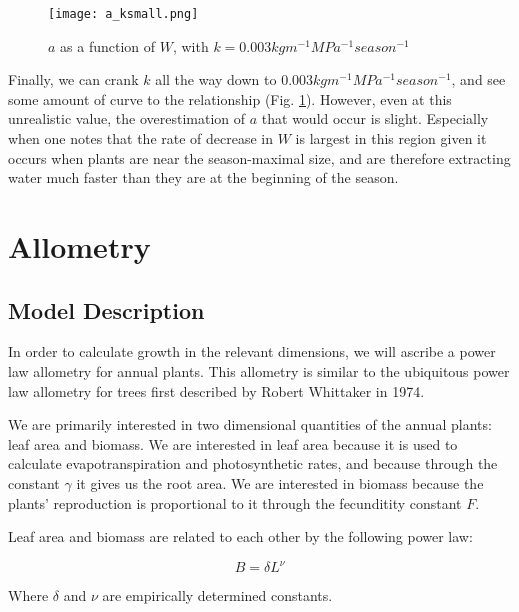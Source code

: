 \documentclass{article}
\begin{document}
  \begin{figure}[h]
    \caption{$a$ as a function of $W$, with $k = 0.003 kg m^{-1} MPa^{-1} season^{-1}$}
    \centering
    \texttt{[image: a\_ksmall.png]}
    \label{fig:a0.003}
  \end{figure}

  Finally, we can crank $k$ all the way down to
  $0.003 kg m^{-1} MPa^{-1} season^{-1}$, and see some amount of curve to the
  relationship (Fig. \ref{fig:a0.003}). However, even at this unrealistic value, the overestimation of
  $a$ that would occur is slight. Especially when one notes that the rate of
  decrease in $W$ is largest in this region given it occurs when plants are near
  the season-maximal size, and are therefore extracting water much faster than
  they are at the beginning of the season.

  \section{Allometry}

  \subsection{Model Description} \label{allometric model description}

  In order to calculate growth in the relevant dimensions, we will ascribe a
  power law allometry for annual plants. This allometry is similar to the
  ubiquitous power law allometry for trees first described by Robert Whittaker
  in 1974.

  We are primarily interested in two dimensional quantities of the annual
  plants: leaf area and biomass. We are interested in leaf area because it is
  used to calculate evapotranspiration and photosynthetic rates, and because
  through the constant $\gamma$ it gives us the root area. We are
  interested in biomass because the plants' reproduction is proportional to it
  through the fecunditity constant $F$.

  Leaf area and biomass are related to each other by the following power law:

  \begin{equation} \label{power allometry}
    B = \delta L^{\nu}
  \end{equation}

  Where $\delta$ and $\nu$ are empirically determined constants.
\end{document}
